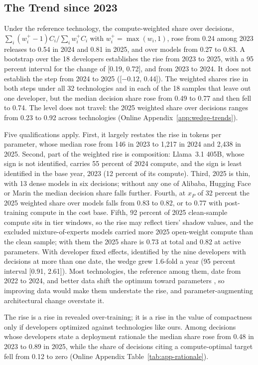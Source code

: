 \subsection{The Trend since 2023}\label{sec:wedge-trends}

Under the reference technology, the compute-weighted share over decisions, $\sum_i(w_i^+-1)C_i/\sum_iw_i^+C_i$ with
$w_i^+=\max(w_i,1)$, rose from 0.24 among 2023 releases to 0.54 in 2024 and 0.81 in 2025, and over models from 0.27 to
0.83. A bootstrap over the 18 developers establishes the rise from 2023 to 2025, with a 95 percent interval for the
change of [0.19, 0.72], and from 2023 to 2024. It does not establish the step from 2024 to 2025 ([$-0.12$, 0.44]). The
weighted shares rise in both steps under all 32 technologies and in each of the 18 samples that leave out one developer,
but the median decision share rose from 0.49 to 0.77 and then fell to 0.74. The level does not travel: the 2025 weighted
share over decisions ranges from 0.23 to 0.92 across technologies (Online Appendix~\ref{app:wedge-trends}).

Five qualifications apply. First, it largely restates the rise in tokens per parameter, whose median rose from 146 in
2023 to 1,217 in 2024 and 2,438 in 2025. Second, part of the weighted rise is composition: Llama~3.1 405B, whose sign is
not identified, carries 55 percent of 2024 compute, and the sign is least identified in the base year, 2023 (12 percent
of its compute). Third, 2025 is thin, with 13 dense models in six decisions; without any one of Alibaba, Hugging Face or
Marin the median decision share falls further. Fourth, at $x_P$ of 32 percent the 2025 weighted share over models falls
from 0.83 to 0.82, or to 0.77 with post-training compute in the cost base. Fifth, 92 percent of 2025 clean-sample
compute sits in tier windows, so the rise may reflect tiers' shadow values, and the excluded mixture-of-experts models
carried more 2025 open-weight compute than the clean sample; with them the 2025 share is 0.73 at total and 0.82 at
active parameters. With developer fixed effects, identified by the nine developers with decisions at more than one date, the
wedge grew 1.6-fold a year (95 percent interval [0.91, 2.61]). Most technologies, the reference among them, date from 2022 to 2024, and better data
shift the optimum toward parameters \citep{bi2024deepseek}, so improving data would make them understate the rise, and
parameter-augmenting architectural change overstate it.

The rise is a rise in revealed over-training; it is a rise in the value of compactness only if developers optimized
against technologies like ours. Among decisions whose developers state a deployment rationale the median share rose from
0.48 in 2023 to 0.89 in 2025, while the share of decisions citing a compute-optimal target fell from 0.12 to zero (Online
Appendix Table~\ref{tab:app-rationale}).

